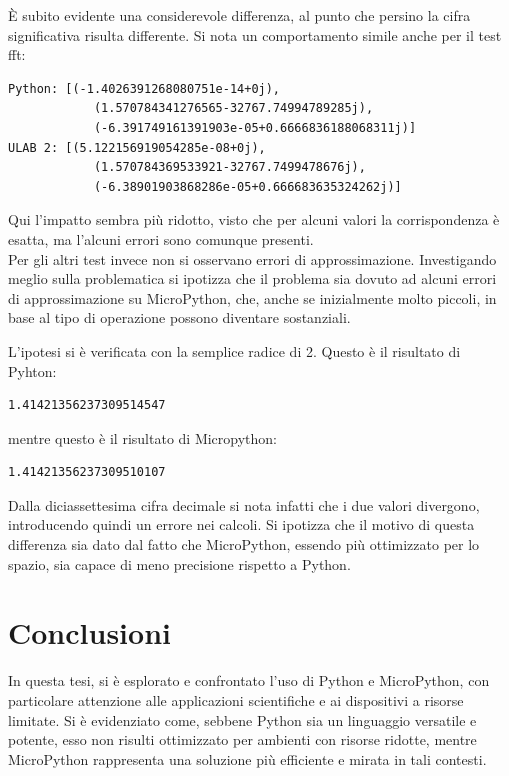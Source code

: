 \documentclass[12pt,a4paper]{report}
\begin{document}
È subito evidente una considerevole differenza, al punto che persino la cifra significativa risulta differente.
Si nota un comportamento simile anche per il test fft:

\begin{verbatim}
Python: [(-1.4026391268080751e-14+0j),
            (1.570784341276565-32767.74994789285j),
            (-6.391749161391903e-05+0.6666836188068311j)]
ULAB 2: [(5.122156919054285e-08+0j),
            (1.570784369533921-32767.7499478676j),
            (-6.38901903868286e-05+0.666683635324262j)]
\end{verbatim}

Qui l'impatto sembra più ridotto, visto che per alcuni valori la corrispondenza è esatta, ma l'alcuni errori sono comunque presenti. \\
Per gli altri test invece non si osservano errori di approssimazione. Investigando meglio sulla problematica si ipotizza che il problema sia dovuto ad alcuni errori di approssimazione su MicroPython, che, anche se inizialmente molto piccoli, in base al tipo di operazione possono diventare sostanziali.

L'ipotesi si è verificata con la semplice radice di 2. Questo è il risultato di Pyhton:

\begin{verbatim}
1.41421356237309514547
\end{verbatim}

mentre questo è il risultato di Micropython:

\begin{verbatim}
1.41421356237309510107
\end{verbatim}

Dalla diciassettesima cifra decimale si nota infatti che i due valori divergono, introducendo quindi un errore nei calcoli. 
Si ipotizza che il motivo di questa differenza sia dato dal fatto che MicroPython, essendo più ottimizzato per lo spazio, sia capace di meno precisione rispetto a Python.

\chapter{Conclusioni}

In questa tesi, si è esplorato e confrontato l'uso di Python e MicroPython, con particolare attenzione alle applicazioni scientifiche e ai dispositivi a risorse limitate. Si è evidenziato come, sebbene Python sia un linguaggio versatile e potente, esso non risulti ottimizzato per ambienti con risorse ridotte, mentre MicroPython rappresenta una soluzione più efficiente e mirata in tali contesti.
\end{document}
